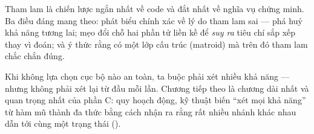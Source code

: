 \documentclass[../../algorithm.tex]{subfiles}
\begin{document}
Tham lam là chiến lược ngắn nhất về code và đắt nhất về nghĩa vụ chứng minh. Ba điều đáng mang theo: phát biểu chính xác về lý do tham lam sai --- phá huỷ khả năng tương lai; mẹo đổi chỗ hai phần tử liền kề để \emph{suy ra} tiêu chí sắp xếp thay vì đoán; và ý thức rằng có một lớp cấu trúc (matroid) mà trên đó tham lam chắc chắn đúng.

Khi không lựa chọn cục bộ nào an toàn, ta buộc phải xét nhiều khả năng --- nhưng không phải xét lại từ đầu mỗi lần. Chương tiếp theo là chương dài nhất và quan trọng nhất của phần C: quy hoạch động, kỹ thuật biến ``xét mọi khả năng'' từ hàm mũ thành đa thức bằng cách nhận ra rằng rất nhiều nhánh khác nhau dẫn tới cùng một trạng thái ().
\ifSubfilesClassLoaded{\printbibliography[title={Nguồn}]}{}
\end{document}

